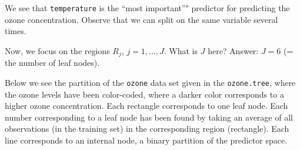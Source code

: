 \documentclass[10pt,ignorenonframetext,]{beamer}
\begin{document}
\begin{frame}[fragile]

We see that \texttt{temperature} is the ``most important''" predictor
for predicting the ozone concentration. Observe that we can split on the
same variable several times.

\end{frame}

\begin{frame}[fragile]

Now, we focus on the regions \(R_j\), \(j=1,\ldots, J\). What is \(J\)
here? Answer: \(J=6\) (= the number of leaf nodes).

Below we see the partition of the \texttt{ozone} data set given in the
\texttt{ozone.tree}, where the ozone levels have been color-coded, where
a darker color corresponds to a higher ozone concentration. Each
rectangle corresponds to one leaf node. Each number corresponding to a
leaf node has been found by taking an average of all observations (in
the training set) in the corresponding region (rectangle). Each line
corresponds to an internal node, a binary partition of the predictor
space.

\end{frame}
\end{document}
